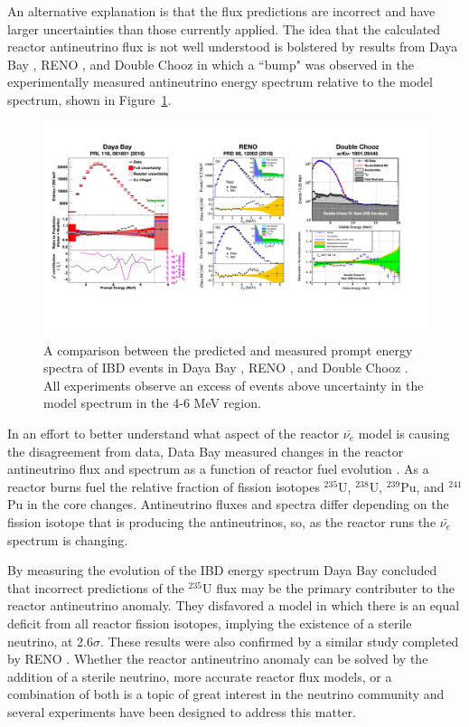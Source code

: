 An alternative explanation is that the flux predictions are incorrect and have larger uncertainties than those currently applied. 
The idea that the calculated reactor antineutrino flux is not well understood is bolstered by results from Daya Bay \cite{DayaBayAnomaly}, RENO \cite{Seo:2016uom}, and Double Chooz \cite{DoubleChooz:2019qbj} in which a ``bump" was observed in the experimentally measured antineutrino energy spectrum relative to the model spectrum, shown in Figure~\ref{fig:spectrums}.

\begin{figure}[t]
	\centering
	\includegraphics[width=1\linewidth]{tex/3-reactorneutrinos-images/Spectrums}
	\caption[Spectrums.]{A comparison between the predicted and measured prompt energy spectra of IBD events in Daya Bay \cite{DayaBayAnomaly}, RENO \cite{Seo:2016uom}, and Double Chooz \cite{DoubleChooz:2019qbj}. All experiments observe an excess of events above uncertainty in the model spectrum in the 4-6 MeV region.}
	\label{fig:spectrums}
\end{figure}

In an effort to better understand what aspect of the reactor $\bar{\nu_{e}}$ model is causing the disagreement from data, Data Bay measured changes in the reactor antineutrino flux and spectrum as a function of reactor fuel evolution \cite{An:2017osx}.
As a reactor burns fuel the relative fraction of fission isotopes $^{235}$U, $^{238}$U, $^{239}$Pu, and $^{241}$Pu in the core changes.
Antineutrino fluxes and spectra differ depending on the fission isotope that is producing the antineutrinos, so, as the reactor runs the $\bar{\nu_{e}}$ spectrum is changing. 

By measuring the evolution of the IBD energy spectrum Daya Bay concluded that incorrect predictions of the $^{235}$U flux may be the primary contributer to the reactor antineutrino anomaly. 
They disfavored a model in which there is an equal deficit from all reactor fission isotopes, implying the existence of a sterile neutrino, at 2.6$\sigma$.
These results were also confirmed by a similar study completed by RENO \cite{PhysRevLett.122.232501}.
Whether the reactor antineutrino anomaly can be solved by the addition of a sterile neutrino, more accurate reactor flux models, or a combination of both is a topic of great interest in the neutrino community and several experiments have been designed to address this matter.
